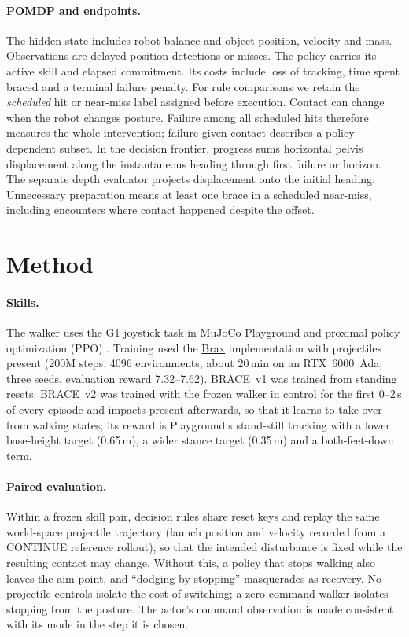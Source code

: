 \documentclass[10pt,twocolumn]{article}
\begin{document}
\paragraph{POMDP and endpoints.} The hidden state includes robot balance and object position, velocity and mass. Observations are delayed position detections or misses. The policy carries its active skill and elapsed commitment. Its costs include loss of tracking, time spent braced and a terminal failure penalty. For rule comparisons we retain the \emph{scheduled} hit or near-miss label assigned before execution. Contact can change when the robot changes posture. Failure among all scheduled hits therefore measures the whole intervention; failure given contact describes a policy-dependent subset. In the decision frontier, progress sums horizontal pelvis displacement along the instantaneous heading through first failure or horizon. The separate depth evaluator projects displacement onto the initial heading. Unnecessary preparation means at least one brace in a scheduled near-miss, including encounters where contact happened despite the offset.

\section{Method}
\paragraph{Skills.} The walker uses the G1 joystick task in MuJoCo Playground \citep{todorov2012mujoco,zakka2025playground} and proximal policy optimization (PPO) \citep{schulman2017ppo}. Training used the \href{https://github.com/google/brax}{Brax} implementation with projectiles present (200M steps, 4096 environments, about 20\,min on an RTX~6000~Ada; three seeds, evaluation reward 7.32--7.62). BRACE~v1 was trained from standing resets. BRACE~v2 was trained with the frozen walker in control for the first 0--2\,s of every episode and impacts present afterwards, so that it learns to take over from walking states; its reward is Playground's stand-still tracking with a lower base-height target (0.65\,m), a wider stance target (0.35\,m) and a both-feet-down term.

\paragraph{Paired evaluation.} Within a frozen skill pair, decision rules share reset keys and replay the same world-space projectile trajectory (launch position and velocity recorded from a CONTINUE reference rollout), so that the intended disturbance is fixed while the resulting contact may change. Without this, a policy that stops walking also leaves the aim point, and ``dodging by stopping'' masquerades as recovery. No-projectile controls isolate the cost of switching; a zero-command walker isolates stopping from the posture. The actor's command observation is made consistent with its mode in the step it is chosen.
\end{document}
